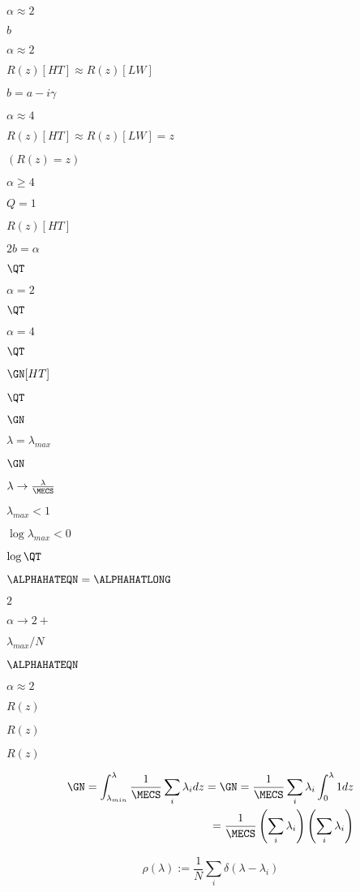$\alpha\approx 2$

$b$

$\alpha\approx 2$

$R(z)[HT]\approx R(z)[LW]$

$b=a-i\gamma$

$\alpha\approx 4$

$R(z)[HT]\approx R(z)[LW]=z$

$(R(z)=z)$

$\alpha \ge 4$

$Q=1$

$R(z)[HT]$

$2b=\alpha$

$\QT$

$\alpha=2$

$\QT$

$\alpha=4$

$\QT$

$\GN[HT] $

$\QT$

$\GN$

$\lambda=\lambda_{max}$

$\GN$

$\lambda\rightarrow\tfrac{\lambda}{\MECS}$

$\lambda_{max}<1$

$\log\lambda_{max}<0$

$\log \QT$

$\ALPHAHATEQN=\ALPHAHATLONG$

$2$

$\alpha\rightarrow 2+$

$\lambda_{max}/N$

$\ALPHAHATEQN$

$\alpha\approx 2$

$R(z)$

$R(z)$

$R(z)$

\begin{align}
\label{eqn:spikes_model_3} 
\GN = 
\int_{\lambda_{min}}^{\lambda}
\dfrac{1}{\MECS}
\sum_{i}\lambda_{i} dz=
\GN = \dfrac{1}{\MECS}\sum_{i}\lambda_{i} \int_{0}^{\lambda} 1 dz \\ \nonumber
= \dfrac{1}{\MECS}\left(\sum_{i}\lambda_{i}\right)\left(\sum_{i}\lambda_{i}\right)
\end{align}

\begin{equation}
\label{eqn:rgo}
\rho(\lambda):=\frac{1}{N}\sum_{i}\delta(\lambda-\lambda_{i})
\end{equation}

